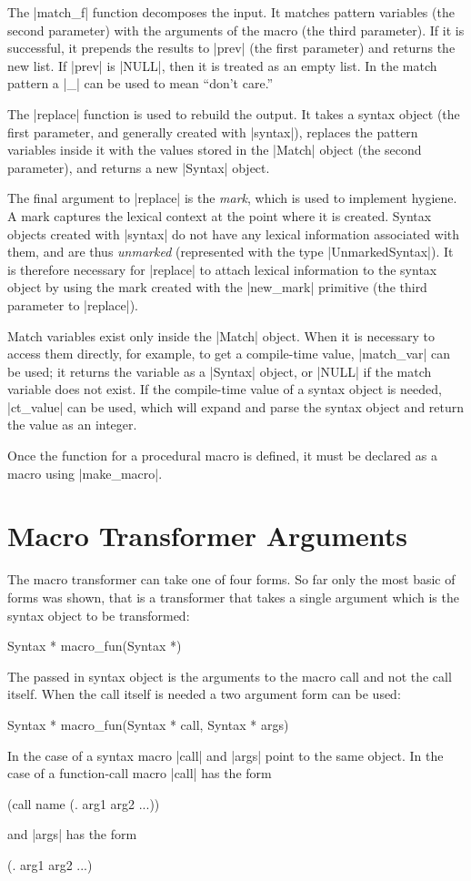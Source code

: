 The |match_f| function decomposes the input.  It matches pattern
variables (the second parameter) with the arguments of the macro (the
third parameter).  If it is successful, it prepends the results to
|prev| (the first parameter) and returns the new list.  If |prev| is
|NULL|, then it is treated as an empty list.  In the match pattern a
|_| can be used to mean ``don't care.''

The |replace| function is used to rebuild the output.  It takes a
syntax object (the first parameter, and generally created with
|syntax|), replaces the pattern variables inside it with the values
stored in the |Match| object (the second parameter), and returns a new
|Syntax| object.

The final argument to |replace| is the \textit{mark}, which is used to
implement hygiene.  A mark captures the lexical context at the point
where it is created.  Syntax objects created with |syntax| do not have
any lexical information associated with them, and are thus
\textit{unmarked} (represented with the type |UnmarkedSyntax|).  It is
therefore necessary for |replace| to attach lexical information to the
syntax object by using the mark created with the |new_mark| primitive
(the third parameter to |replace|).

Match variables exist only inside the |Match| object.  When it is
necessary to access them directly, for example, to get a compile-time
value, |match_var| can be used; it returns the variable as a |Syntax|
object, or |NULL| if the match variable does not exist.  If the 
compile-time value of a syntax object is needed, |ct_value| can be used, which
will expand and parse the syntax object and return the value as an
integer.  

Once the function for a procedural macro is defined, it must be
declared as a macro using |make_macro|.

\section{Macro Transformer Arguments}

The macro transformer can take one of four forms.  So far only the
most basic of forms was shown, that is a transformer that takes a
single argument which is the syntax object to be transformed:
\begin{code}
Syntax * macro_fun(Syntax *)
\end{code}
The passed in syntax object is the arguments to the macro call and not
the call itself.  When the call itself is needed a two argument form
can be used:
\begin{code}
Syntax * macro_fun(Syntax * call, Syntax * args)
\end{code}
In the case of a syntax macro |call| and |args| point to the same object.
In the case of a function-call macro |call| has the form
\begin{code} 
(call name (. arg1 arg2 ...))
\end{code}
and |args| has the form 
\begin{code}
(. arg1 arg2 ...)
\end{code}


